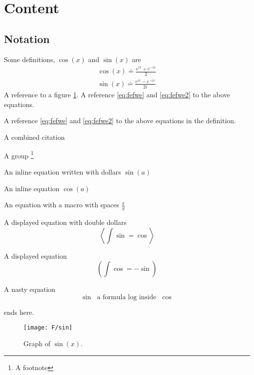 \section{Content}

\subsection{Notation}

\begin{Defn}
  \label{defn:1}
  Some definitions, $\cos(x)$ and \(\sin(x)\) are
  \begin{eqnarray}
    \cos(x) \doteq \frac{e^{ix}+e^{-ix}}{2}  \label{eq:fefwe} \\
    \sin(x) \doteq \frac{e^{ix}-e^{-ix}}{2i} \label{eq:fefwe2}
  \end{eqnarray}
  A reference to a figure \ref{fig:a354}.
  A reference \eqref{eq:fefwe} and  \eqref{eq:fefwe2} to the above equations.
\end{Defn}


A reference \eqref{eq:fefwe} and  \eqref{eq:fefwe2} to the above equations
in the definition.

A combined citation
\cite{einstein,knuthwebsite}

A group
\footnote{A footnote}
\bgroup\em

An inline equation written with dollars $\sin(a)$

An inline equation  \(\cos(a)\)

An equation with a macro with spaces
\(\frac x y\)

A displayed equation with double dollars
$$ \left<\int\sin = \cos \right>$$

A displayed equation
\[ \left(\int\cos = -\sin\right)\]

A nasty equation
$$ \sin \text{ a formula $\log$ inside } \cos $$

\egroup
ends here.

\begin{figure}[ht]\label{fig:a354}
  \begin{center}
    \texttt{[image: F/sin]}
    \caption{Graph of \(\sin(x)\).}
  \end{center}
\end{figure}


\lipsum[2]


